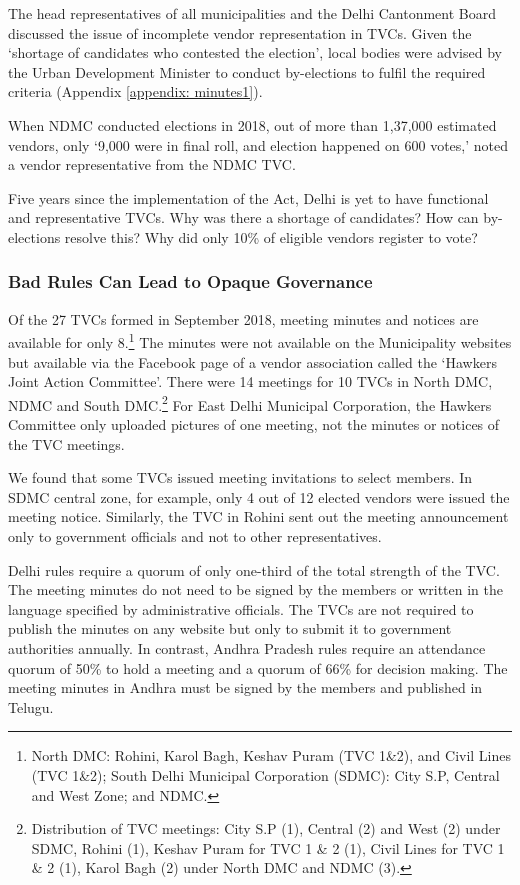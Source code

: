 \documentclass[a4paper, 12pt, twoside]{article}
\begin{document}
{{The head representatives of all municipalities and the Delhi Cantonment Board discussed the issue of incomplete vendor representation in TVCs. Given the `shortage of candidates who contested the election', local bodies were advised by the Urban Development Minister to conduct by-elections to fulfil the required criteria (Appendix \ref{appendix: minutes1}).  

When NDMC conducted elections in 2018, out of more than 1,37,000 estimated vendors, only `9,000 were in final roll, and election happened on 600 votes,' noted a vendor representative from the NDMC TVC. 

Five years since the implementation of the Act, Delhi is yet to have functional and representative TVCs. Why was there a shortage of candidates? How can by-elections resolve this? Why did only 10\% of eligible vendors register to vote? 

\subsubsection*{Bad Rules Can Lead to Opaque Governance}

Of the 27 TVCs formed in September 2018, meeting minutes and notices are available for only 8.\footnote{North DMC: Rohini, Karol Bagh, Keshav Puram (TVC 1\&2), and Civil Lines (TVC 1\&2); South Delhi Municipal Corporation (SDMC): City S.P, Central and West Zone; and NDMC.
} The minutes were not available on the Municipality websites but available via the Facebook page of a vendor association called the `Hawkers Joint Action Committee'. There were 14 meetings for 10 TVCs in North DMC, NDMC and South DMC.\footnote{Distribution of TVC meetings: City S.P (1), Central (2) and West (2) under SDMC, Rohini (1), Keshav Puram for TVC 1 \& 2 (1), Civil Lines for TVC 1 \& 2 (1), Karol Bagh (2) under North DMC and NDMC (3).
} For East Delhi Municipal Corporation, the Hawkers Committee only uploaded pictures of one meeting, not the minutes or notices of the TVC meetings. 

We found that some TVCs issued meeting invitations to select members. In SDMC central zone, for example, only 4 out of 12 elected vendors were issued the meeting notice. Similarly, the TVC in Rohini sent out the meeting announcement only to government officials and not to other representatives. 

Delhi rules require a quorum of only one-third of the total strength of the TVC. The meeting minutes do not need to be signed by the members or written in the language specified by administrative officials. The TVCs are not required to publish the minutes on any website but only to submit it to government authorities annually. In contrast, Andhra Pradesh rules require an attendance quorum of 50\% to hold a meeting and a quorum of 66\% for decision making. The meeting minutes in Andhra must be signed by the members and published in Telugu.

}}
\end{document}
